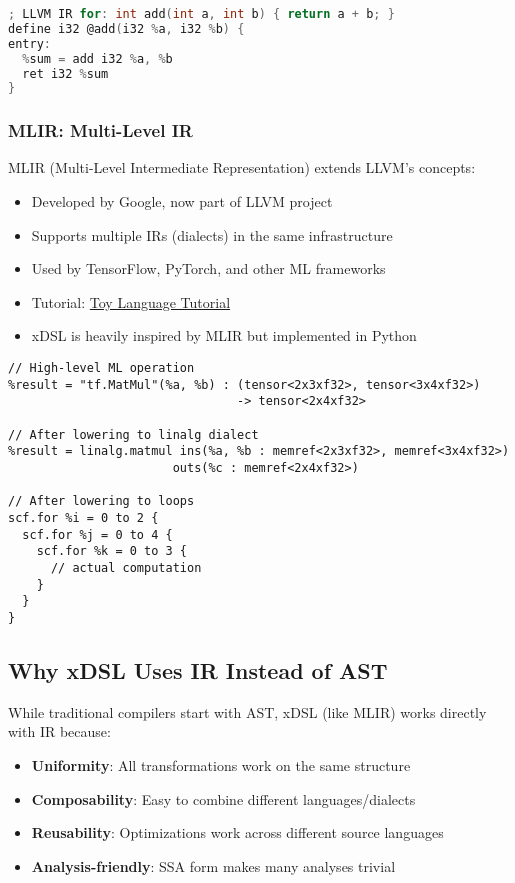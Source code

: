 \documentclass[11pt,a4paper]{article}
\begin{document}
\begin{lstlisting}[language=C, caption=LLVM IR Example]
; LLVM IR for: int add(int a, int b) { return a + b; }
define i32 @add(i32 %a, i32 %b) {
entry:
  %sum = add i32 %a, %b
  ret i32 %sum
}
\end{lstlisting}

\subsubsection{MLIR: Multi-Level IR}

MLIR (Multi-Level Intermediate Representation) extends LLVM's concepts:
\begin{itemize}
    \item Developed by Google, now part of LLVM project
    \item Supports multiple IRs (dialects) in the same infrastructure
    \item Used by TensorFlow, PyTorch, and other ML frameworks
    \item Tutorial: \href{https://mlir.llvm.org/docs/Tutorials/Toy/}{Toy Language Tutorial}
    \item xDSL is heavily inspired by MLIR but implemented in Python
\end{itemize}

\begin{lstlisting}[caption=MLIR Example - Multiple Abstraction Levels]
// High-level ML operation
%result = "tf.MatMul"(%a, %b) : (tensor<2x3xf32>, tensor<3x4xf32>) 
                                -> tensor<2x4xf32>

// After lowering to linalg dialect
%result = linalg.matmul ins(%a, %b : memref<2x3xf32>, memref<3x4xf32>)
                       outs(%c : memref<2x4xf32>)

// After lowering to loops
scf.for %i = 0 to 2 {
  scf.for %j = 0 to 4 {
    scf.for %k = 0 to 3 {
      // actual computation
    }
  }
}
\end{lstlisting}

\subsection{Why xDSL Uses IR Instead of AST}

While traditional compilers start with AST, xDSL (like MLIR) works directly with IR because:
\begin{itemize}
    \item \textbf{Uniformity}: All transformations work on the same structure
    \item \textbf{Composability}: Easy to combine different languages/dialects
    \item \textbf{Reusability}: Optimizations work across different source languages
    \item \textbf{Analysis-friendly}: SSA form makes many analyses trivial
\end{itemize}
\end{document}
